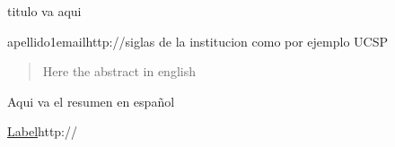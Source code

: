\begin{research}{titulo va aqui}

\begin{institutioninfo}
\end{institutioninfo}

\begin{authorsinfo}
\author{nombre1}{apellido1}{email}{http://}{siglas de la institucion como por ejemplo UCSP}
\end{authorsinfo}

\begin{generalinfo}
\end{generalinfo}

\begin{abstract}
Here the abstract in english
\end{abstract}

\begin{keywords}
\end{keywords}

\begin{resumen}
Aqui va el resumen en español
\end{resumen}

\begin{claves}
\end{claves}

\begin{files}
\url{Label}{http://}

\end{files}

\end{research}